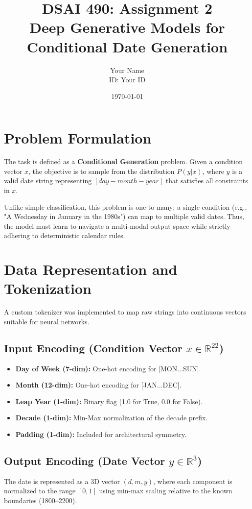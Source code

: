 \documentclass[12pt, a4paper]{article}
\title{DSAI 490: Assignment 2 \\ \textbf{Deep Generative Models for Conditional Date Generation}}
\author{Your Name \\ ID: Your ID}
\date{\today}
\begin{document}
\maketitle

\section{Problem Formulation}
The task is defined as a \textbf{Conditional Generation} problem. Given a condition vector $x$, the objective is to sample from the distribution $P(y|x)$, where $y$ is a valid date string representing $[day-month-year]$ that satisfies all constraints in $x$. 

Unlike simple classification, this problem is one-to-many; a single condition (e.g., "A Wednesday in January in the 1980s") can map to multiple valid dates. Thus, the model must learn to navigate a multi-modal output space while strictly adhering to deterministic calendar rules.

\section{Data Representation and Tokenization}
A custom tokenizer was implemented to map raw strings into continuous vectors suitable for neural networks.

\subsection{Input Encoding (Condition Vector $x \in \mathbb{R}^{22}$)}
\begin{itemize}
    \item \textbf{Day of Week (7-dim):} One-hot encoding for [MON...SUN].
    \item \textbf{Month (12-dim):} One-hot encoding for [JAN...DEC].
    \item \textbf{Leap Year (1-dim):} Binary flag (1.0 for True, 0.0 for False).
    \item \textbf{Decade (1-dim):} Min-Max normalization of the decade prefix.
    \item \textbf{Padding (1-dim):} Included for architectural symmetry.
\end{itemize}

\subsection{Output Encoding (Date Vector $y \in \mathbb{R}^3$)}
The date is represented as a 3D vector $(d, m, y)$, where each component is normalized to the range $[0, 1]$ using min-max scaling relative to the known boundaries (1800--2200).
\end{document}
